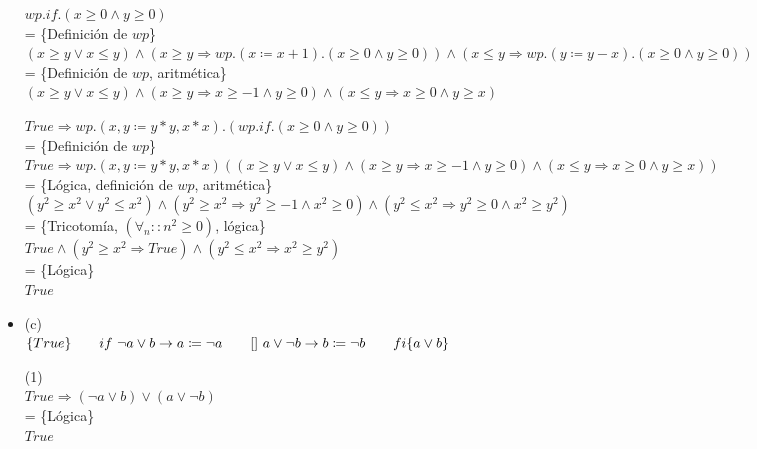 \documentclass[12pt]{article}
\begin{document}
\begin{itemize}
    \bigbreak

    $wp.if.(x \ge 0 \land y \ge 0)$\\
    = \{Definición de $wp$\}\\
    $(x \ge y \lor x \le y) \land (x \ge y \Rightarrow wp.(x \coloneqq x + 1).(x \ge 0 \land y \ge 0)) \land (x \le y \Rightarrow wp.(y \coloneqq y - x).(x \ge 0 \land y \ge 0))$\\
    = \{Definición de $wp$, aritmética\}\\
    $(x \ge y \lor x \le y) \land (x \ge y \Rightarrow x \ge -1 \land y \ge 0) \land (x \le y \Rightarrow x \ge 0 \land y \ge x)$

    \bigbreak
    $True \Rightarrow wp.(x, y \coloneqq y *y, x * x).(wp.if.(x \ge 0 \land y \ge 0))$\\
    = \{Definición de $wp$\}\\
    $True \Rightarrow wp.(x, y \coloneqq y * y, x * x)((x \ge y \lor x \le y) \land (x \ge y \Rightarrow x \ge -1 \land y \ge 0) \land (x \le y \Rightarrow x \ge 0 \land y \ge x))$\\
    = \{Lógica, definición de $wp$, aritmética\}\\
    $(y^2 \ge x^2 \lor y^2 \le x^2) \land (y^2 \ge x^2 \Rightarrow y^2 \ge -1 \land x^2 \ge 0) \land (y^2 \le x^2 \Rightarrow y^2 \ge 0 \land x^2 \ge y^2)$\\
    = \{Tricotomía, $(\forall_n :: n^2 \ge 0)$, lógica\}\\
    $True \land (y^2 \ge x^2 \Rightarrow True) \land (y^2 \le x^2 \Rightarrow x^2 \ge y^2)$\\
    = \{Lógica\}\\
    $True$

    \item (c)\\ 
            $\{True\}\\
            \hspace*{20pt}if~ \neg a \lor b \rightarrow a \coloneqq \neg a\\
            \hspace*{20pt}[]~ a \lor \neg b \rightarrow b \coloneqq \neg b\\
            \hspace*{20pt}fi\\
            \{a \lor b\}$

    \bigbreak

    (1)\\
    $True \Rightarrow (\neg a \lor b) \lor (a \lor \neg b)$\\
    = \{Lógica\}\\
    $True$


\end{itemize}
\end{document}
